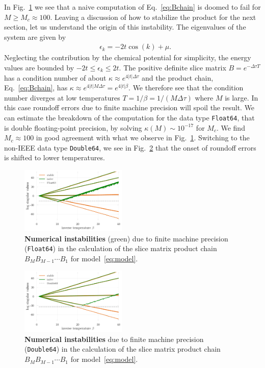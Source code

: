 \documentclass[%
 reprint,
superscriptaddress,
citeautoscript,
showpacs,
 amsmath,amssymb,
 aps,
 prb,
longbibliography,
]{revtex4-1}
\begin{document}
In Fig.~\ref{fig:naive_vs_stable} we see that a naive computation of Eq.~\ref{eq:Bchain} is doomed to fail for $M \geq M_c \approx 100$. Leaving a discussion of how to stabilize the product for the next section, let us understand the origin of this instability. The eigenvalues of the system are given by
\begin{align}
	&\epsilon_k = -2t\cos(k) + \mu.
\end{align}
Neglecting the contribution by the chemical potential for simplicity, the energy values are bounded by $-2t \leq \epsilon_k \leq 2t$. The positive definite slice matrix $B = e^{-\Delta \tau T}$ has a condition number of about $\kappa \approx e^{4|t|\Delta \tau}$ and the product chain, Eq.~\ref{eq:Bchain}, has $\kappa \approx e^{4|t|M\Delta \tau} = e^{4|t|\beta}$. We therefore see that the condition number diverges at low temperatures $T=1/\beta = 1/(M \Delta\tau)$ where $M$ is large. In this case roundoff errors due to finite machine precision will spoil the result. We can estimate the breakdown of the computation for the data type \texttt{Float64}, that is double floating-point precision\cite{Goldberg1991}, by solving $\kappa(M) \sim 10^{-17}$ for $M_c$. We find $M_c \approx 100$ in good agreement with what we observe in Fig.~\ref{fig:naive_vs_stable}. Switching to the non-IEEE data type \texttt{Double64}, we see in Fig.~\ref{fig:naive_vs_stable_db64} that the onset of roundoff errors is shifted to lower temperatures.

\begin{figure}[t]
	\includegraphics[width=0.45\textwidth]{../notebooks/naive_vs_stable.pdf}
	\caption{\textbf{Numerical instabilities} (green) due to finite machine precision (\texttt{Float64}) in the calculation of the slice matrix product chain $B_M B_{M-1} \cdots B_1$ for model~\eqref{eq:model}. \label{fig:naive_vs_stable}}
\end{figure}

\begin{figure}[t]
	\includegraphics[width=0.45\textwidth]{../notebooks/naive_vs_stable_db64.pdf}
	\caption{\textbf{Numerical instabilities} due to finite machine precision (\texttt{Double64}) in the calculation of the slice matrix product chain $B_M B_{M-1} \cdots B_1$ for model~\eqref{eq:model}. \label{fig:naive_vs_stable_db64}}
\end{figure}
\end{document}
